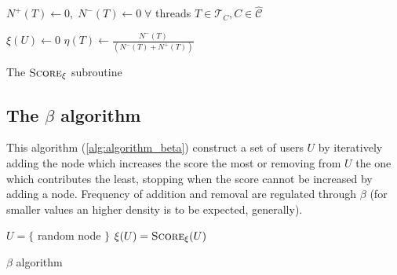\begin{algorithm}
	\SetAlgoLined
	$N^{+} (T) \leftarrow 0, \; N^{-} (T) \leftarrow 0\; \forall $ threads $T
		\in \mathcal{T}_{C}, C \in \mathcal{\hat{C}}   $ \;


	$\xi(U) \leftarrow 0$ \;
	$\eta(T) \leftarrow\frac{N^{-}(T)}{(N^{-}(T) + N^{+} (T))}$ \;

	\caption{The $\textsc{Score}_{\xi}  $ subroutine}
	\label{alg:score_xi}
\end{algorithm}

\subsection{The $\beta$ algorithm}%
\label{ssub:the_beta_approach}

This algorithm (\autoref{alg:algorithm_beta}) construct a set of users $U$ by
iteratively adding the node which increases the score the most or removing from
$U$ the one which contributes the least, stopping when the score cannot be
increased by adding a node. Frequency of addition and removal are regulated
through $\beta $ (for smaller values an higher density is to be expected,
generally).

\begin{algorithm}
	\SetAlgoLined
	$U = \{$ random node $\}$\;
	$\xi(U) = \textsc{Score}_{\xi}(U)$ \;
	\caption{$\beta$ algorithm}
	\label{alg:algorithm_beta}
\end{algorithm}

